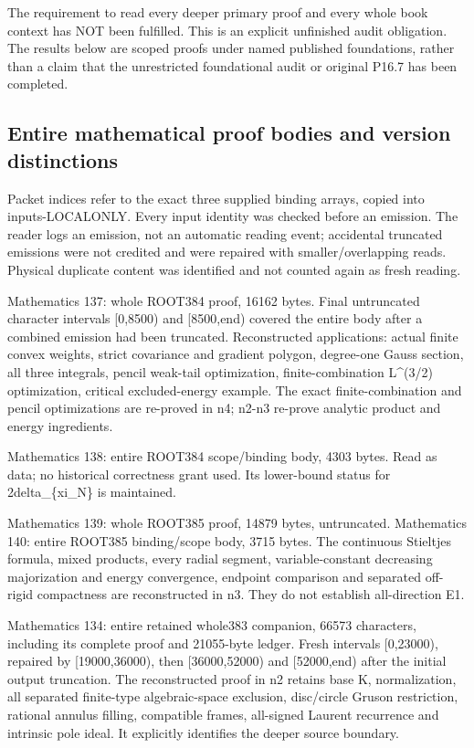 \documentclass[11pt]{article}
\begin{document}
The requirement to read every deeper primary proof and every whole book context has NOT been fulfilled. This is an explicit unfinished audit obligation. The results below are scoped proofs under named published foundations, rather than a claim that the unrestricted foundational audit or original P16.7 has been completed.

\subsection*{Entire mathematical proof bodies and version distinctions}

Packet indices refer to the exact three supplied binding arrays, copied into inputs-LOCALONLY. Every input identity was checked before an emission. The reader logs an emission, not an automatic reading event; accidental truncated emissions were not credited and were repaired with smaller/overlapping reads. Physical duplicate content was identified and not counted again as fresh reading.

Mathematics 137: whole ROOT384 proof, 16162 bytes. Final untruncated character intervals [0,8500) and [8500,end) covered the entire body after a combined emission had been truncated. Reconstructed applications: actual finite convex weights, strict covariance and gradient polygon, degree-one Gauss section, all three integrals, pencil weak-tail optimization, finite-combination L\textasciicircum{}(3/2) optimization, critical excluded-energy example. The exact finite-combination and pencil optimizations are re-proved in n4; n2-n3 re-prove analytic product and energy ingredients.

Mathematics 138: entire ROOT384 scope/binding body, 4303 bytes. Read as data; no historical correctness grant used. Its lower-bound status for 2delta\_\{xi\_N\} is maintained.

Mathematics 139: whole ROOT385 proof, 14879 bytes, untruncated. Mathematics 140: entire ROOT385 binding/scope body, 3715 bytes. The continuous Stieltjes formula, mixed products, every radial segment, variable-constant decreasing majorization and energy convergence, endpoint comparison and separated off-rigid compactness are reconstructed in n3. They do not establish all-direction E1.

Mathematics 134: entire retained whole383 companion, 66573 characters, including its complete proof and 21055-byte ledger. Fresh intervals [0,23000), repaired by [19000,36000), then [36000,52000) and [52000,end) after the initial output truncation. The reconstructed proof in n2 retains base K, normalization, all separated finite-type algebraic-space exclusion, disc/circle Gruson restriction, rational annulus filling, compatible frames, all-signed Laurent recurrence and intrinsic pole ideal. It explicitly identifies the deeper source boundary.
\end{document}
